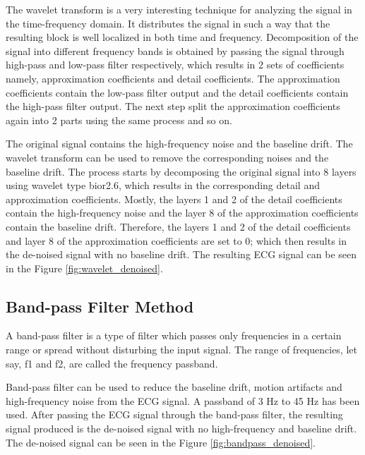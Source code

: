 The wavelet transform is a very interesting technique for analyzing the signal in the time-frequency domain. It distributes the signal in such a way that the resulting block is well localized in both time and frequency. Decomposition of the signal into different frequency bands is obtained by passing the signal through high-pass and low-pass filter respectively, which results in 2 sets of coefficients namely, approximation coefficients and detail coefficients. The approximation coefficients contain the low-pass filter output and the detail coefficients contain the high-pass filter output. The next step split the approximation coefficients again into 2 parts using the same process and so on.

The original signal contains the high-frequency noise and the baseline drift. The wavelet transform can be used to remove the corresponding noises and the baseline drift. The process starts by decomposing the original signal into 8 layers using wavelet type bior2.6, which results in the corresponding detail and approximation coefficients. Mostly, the layers 1 and 2 of the detail coefficients contain the high-frequency noise and the layer 8 of the approximation coefficients contain the baseline drift. Therefore, the layers 1 and 2 of the detail coefficients and layer 8 of the approximation coefficients are set to 0; which then results in the de-noised signal with no baseline drift. The resulting ECG signal can be seen in the Figure \ref{fig:wavelet_denoised}. 




\subsection{Band-pass Filter Method}
A band-pass filter is a type of filter which passes only frequencies in a certain range or spread without disturbing the input signal. The range of frequencies, let say, f1 and f2, are called the frequency passband.

Band-pass filter can be used to reduce the baseline drift, motion artifacts and high-frequency noise from the ECG signal. A passband of 3 Hz to 45 Hz has been used. After passing the ECG signal through the band-pass filter, the resulting signal produced is the de-noised signal with no high-frequency and baseline drift. The de-noised signal can be seen in the Figure \ref{fig:bandpass_denoised}. 

